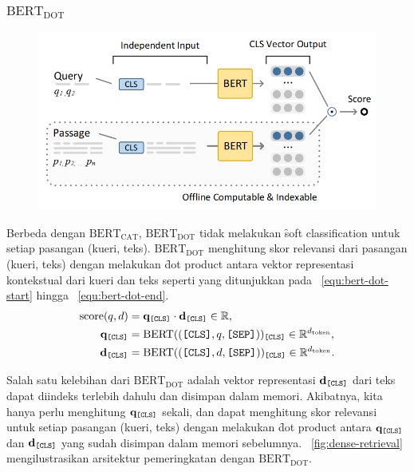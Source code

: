 		\subsubsection{$\text{BERT}_{\text{DOT}}$}
		\label{sec:bert-dot}
		\begin{figure}
			\centering
			\includegraphics[width=1\textwidth]{assets/pics/bertdot.png}
			\label{fig:bert-dot}
		\end{figure}

		Berbeda dengan $\text{BERT}_{\text{CAT}}$, $\text{BERT}_{\text{DOT}}$ tidak melakukan \f{soft classification} untuk setiap pasangan (kueri, teks). $\text{BERT}_{\text{DOT}}$ menghitung skor relevansi dari pasangan (kueri, teks) dengan melakukan \f{dot product} antara vektor representasi kontekstual dari kueri dan teks seperti yang ditunjukkan pada \equ~\ref{equ:bert-dot-start} hingga \equ~\ref{equ:bert-dot-end}.
		\begin{align}
			\label{equ:bert-dot-start}
			\text{score}(q,d) &= \mathbf{q}_{\text{\texttt{[CLS]}}} \cdot \mathbf{d}_{\text{\texttt{[CLS]}}} \in \mathbb{R}, \\
			\mathbf{q}_{\text{\texttt{[CLS]}}} &= \text{BERT}((\text{\texttt{[CLS]}}, q, \text{\texttt{[SEP]}}))_{\text{\texttt{[CLS]}}} \in \mathbb{R}^{d_{\text{token}}}, \\
			\mathbf{d}_{\text{\texttt{[CLS]}}} &= \text{BERT}((\text{\texttt{[CLS]}}, d, \text{\texttt{[SEP]}}))_{\text{\texttt{[CLS]}}} \in \mathbb{R}^{d_{\text{token}}}.
			\label{equ:bert-dot-end}
		\end{align}

		Salah satu kelebihan dari $\text{BERT}_{\text{DOT}}$ adalah vektor representasi $\mathbf{d}_{\text{\texttt{[CLS]}}}$ dari teks dapat diindeks terlebih dahulu dan disimpan dalam memori. Akibatnya, kita hanya perlu menghitung $\mathbf{q}_{\text{\texttt{[CLS]}}}$ sekali, dan dapat menghitung skor relevansi untuk setiap pasangan (kueri, teks) dengan melakukan \f{dot product} antara $\mathbf{q}_{\text{\texttt{[CLS]}}}$ dan $\mathbf{d}_{\text{\texttt{[CLS]}}}$ yang sudah disimpan dalam memori sebelumnya. \pic~\ref{fig:dense-retrieval} mengilustrasikan arsitektur pemeringkatan dengan $\text{BERT}_{\text{DOT}}$.


